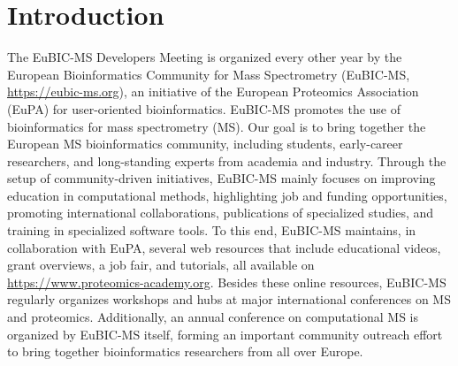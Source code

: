 \section{Introduction}
The EuBIC-MS Developers Meeting is organized every other year by the European Bioinformatics Community for Mass Spectrometry (EuBIC-MS, \url{https://eubic-ms.org}), an initiative of the European Proteomics Association (EuPA) for user-oriented bioinformatics. EuBIC-MS promotes the use of bioinformatics for mass spectrometry (MS). Our goal is to bring together the European MS bioinformatics community, including students, early-career researchers, and long-standing experts from academia and industry. Through the setup of community-driven initiatives, EuBIC-MS mainly focuses on improving education in computational methods, highlighting job and funding opportunities, promoting international collaborations, publications of specialized studies, and training in specialized software tools. To this end, EuBIC-MS maintains, in collaboration with EuPA, several web resources that include educational videos, grant overviews, a job fair, and tutorials, all available on \url{https://www.proteomics-academy.org}. Besides these online resources, EuBIC-MS regularly organizes workshops and hubs at major international conferences on MS and proteomics. Additionally, an annual conference on computational MS is organized by EuBIC-MS itself, forming an important community outreach effort to bring together bioinformatics researchers from all over Europe.

